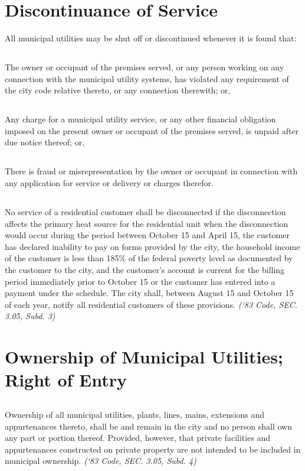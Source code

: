 \documentclass[code.tex]{subfiles}
\begin{document}
\section{Discontinuance of Service}
All municipal utilities may be shut off or discontinued whenever it is found that:
\subsection{}
The owner or occupant of the premises served, or any person working on any connection with the municipal utility systems, has violated any requirement of the city code relative thereto, or any connection therewith; or,
\subsection{}
Any charge for a municipal utility service, or any other financial obligation imposed on the present owner or occupant of the premises served, is unpaid after due notice thereof; or,
\subsection{}
There is fraud or misrepresentation by the owner or occupant in connection with any application for service or delivery or charges therefor.
\subsection{}
No service of a residential customer shall be disconnected if the disconnection affects the primary heat source for the residential unit when the disconnection would occur during the period between October 15 and April 15, the customer has declared inability to pay on forms provided by the city, the household income of the customer is less than 185\% of the federal poverty level as documented by the customer to the city, and the customer’s account is current for the billing period immediately prior to October 15 or the customer has entered into a payment under the schedule.  The city shall, between August 15 and October 15 of each year, notify all residential customers of these provisions.\newline
\emph{(‘83 Code, SEC. 3.05, Subd. 3)}
\section{Ownership of Municipal Utilities; Right of Entry}
\subsection{}
Ownership of all municipal utilities, plants, lines, mains, extensions and appurtenances thereto, shall be and remain in the city and no person shall own any part or portion thereof.  Provided, however, that private facilities and appurtenances constructed on private property are not intended to be included in municipal ownership.\newline
\emph{(‘83 Code, SEC. 3.05, Subd. 4)}
\end{document}
